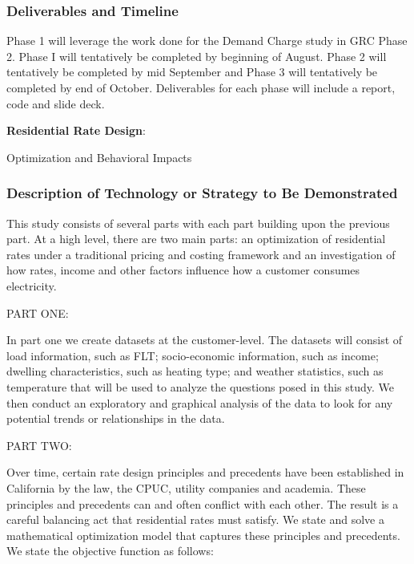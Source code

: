 \documentclass[12pt]{article}
\begin{document}
\subsubsection*{Deliverables and Timeline}

Phase 1 will leverage the work done for the Demand Charge study in GRC Phase 2. Phase I will tentatively be completed by beginning of August. Phase 2 will tentatively be completed by mid September and Phase 3 will tentatively be completed by end of October. Deliverables for each phase will include a report, code and slide deck. 


\pagebreak



{\centering \Large \textbf{Residential Rate Design}:

}
{\centering \Large Optimization and Behavioral Impacts

}


\subsubsection*{Description of Technology or Strategy to Be Demonstrated}

This study consists of several parts with each part building upon the previous part. At a high level, there are two main parts: an optimization of residential rates under a traditional pricing and costing framework and an investigation of how rates, income and other factors influence how a customer consumes electricity.

\noindent PART ONE:

In part one we create datasets at the customer-level. The datasets will consist of load information, such as FLT; socio-economic information, such as income; dwelling characteristics, such as heating type; and weather statistics, such as temperature that will be used to analyze the questions posed in this study. We then conduct an exploratory and graphical analysis of the data to look for any potential trends or relationships in the data. \newline

\noindent PART TWO:

Over time, certain rate design principles and precedents have been established in California by the law, the CPUC, utility companies and academia. These principles and precedents can and often conflict with each other. The result is a careful balancing act that residential rates must satisfy. We state and solve a mathematical optimization model that captures these principles and precedents. We state the objective function as follows:
\end{document}
